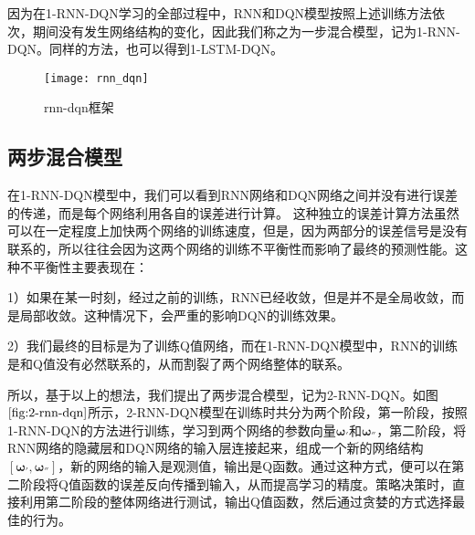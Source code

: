 因为在1-RNN-DQN学习的全部过程中，RNN和DQN模型按照上述训练方法依次，期间没有发生网络结构的变化，因此我们称之为一步混合模型，记为1-RNN-DQN。同样的方法，也可以得到1-LSTM-DQN。



\begin{figure}[htbp]
\centering
\texttt{[image: rnn\_dqn]}
\caption{rnn-dqn框架}
\label{fig:rnn_dqn}
\end{figure}



\subsection{两步混合模型}
在1-RNN-DQN模型中，我们可以看到RNN网络和DQN网络之间并没有进行误差的传递，而是每个网络利用各自的误差进行计算。
这种独立的误差计算方法虽然可以在一定程度上加快两个网络的训练速度，但是，因为两部分的误差信号是没有联系的，所以往往会因为这两个网络的训练不平衡性而影响了最终的预测性能。这种不平衡性主要表现在：

1）如果在某一时刻，经过之前的训练，RNN已经收敛，但是并不是全局收敛，而是局部收敛。这种情况下，会严重的影响DQN的训练效果。

2）我们最终的目标是为了训练Q值网络，而在1-RNN-DQN模型中，RNN的训练是和Q值没有必然联系的，从而割裂了两个网络整体的联系。

所以，基于以上的想法，我们提出了两步混合模型，记为2-RNN-DQN。如图$\ref{fig:2-rnn-dqn}$所示，2-RNN-DQN模型在训练时共分为两个阶段，第一阶段，按照1-RNN-DQN的方法进行训练，学习到两个网络的参数向量$\mathbf{\omega_{'}}$和$\mathbf{\omega_{''}}$，第二阶段，将RNN网络的隐藏层和DQN网络的输入层连接起来，组成一个新的网络结构$[\mathbf{\omega_{'}},\mathbf{\omega_{''}}]$，新的网络的输入是观测值，输出是Q函数。通过这种方式，便可以在第二阶段将Q值函数的误差反向传播到输入，从而提高学习的精度。策略决策时，直接利用第二阶段的整体网络进行测试，输出Q值函数，然后通过贪婪的方式选择最佳的行为。

